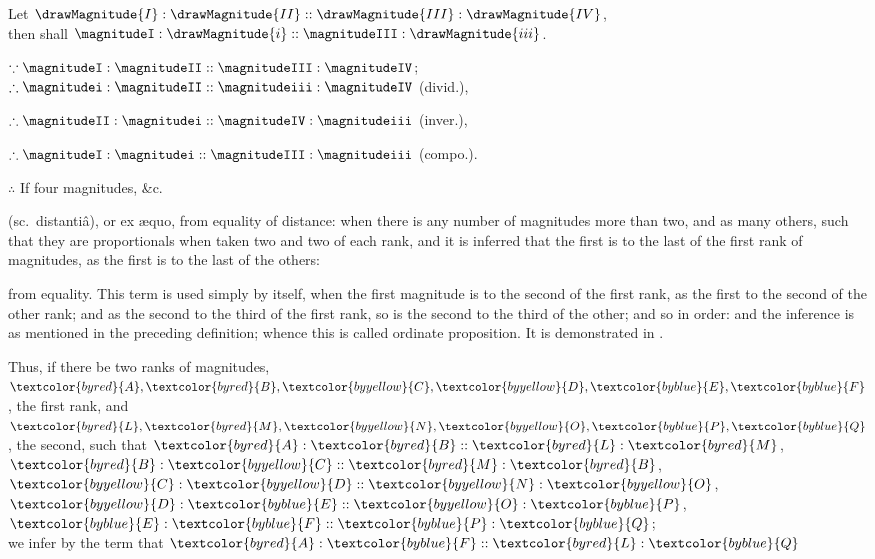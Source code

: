 \begin{center}
Let $\drawMagnitude{I} : \drawMagnitude{II} :: \drawMagnitude{III} : \drawMagnitude{IV}$,\\
then shall $\magnitudeI : \drawMagnitude{i} :: \magnitudeIII : \drawMagnitude{iii}$.

$\because \magnitudeI : \magnitudeII :: \magnitudeIII : \magnitudeIV$;\\ %
$\therefore \magnitudei : \magnitudeII :: \magnitudeiii : \magnitudeIV$ (divid.), %

$\therefore \magnitudeII : \magnitudei :: \magnitudeIV : \magnitudeiii$ (inver.),

$\therefore \magnitudeI : \magnitudei :: \magnitudeIII : \magnitudeiii$ (compo.).

$\therefore$ If four magnitudes, \&c.
\end{center}


\label{def:V.XVIII} 
 (sc.\ distantiâ), or ex \ae quo, from equality of distance: when there is any number of magnitudes more than two, and as many others, such that they are proportionals when taken two and two of each rank, and it is inferred that the first is to the last of the first rank of magnitudes, as the first is to the last of the others: 

\vfill\pagebreak

\label{def:V.XIX} 
\def\varA{\textcolor{byred}{A}}
\def\varB{\textcolor{byred}{B}}
\def\varC{\textcolor{byyellow}{C}}
\def\varD{\textcolor{byyellow}{D}}
\def\varE{\textcolor{byblue}{E}}
\def\varF{\textcolor{byblue}{F}}
\def\varL{\textcolor{byred}{L}}
\def\varM{\textcolor{byred}{M}}
\def\varN{\textcolor{byyellow}{N}}
\def\varO{\textcolor{byyellow}{O}}
\def\varP{\textcolor{byblue}{P}}
\def\varQ{\textcolor{byblue}{Q}}
 from equality. This term is used simply by itself, when the first magnitude is to the second of the first rank, as the first to the second of the other rank; and as the second to the third of the first rank, so is the second to the third of the other; and so in order: and the inference is as mentioned in the preceding definition; whence this is called ordinate proposition. It is demonstrated in .

\begin{center}
Thus, if there be two ranks of magnitudes,\\
$\varA, \varB, \varC, \varD, \varE, \varF$, the first rank,
and $\varL, \varM, \varN, \varO, \varP, \varQ$, the second,
such that $\varA : \varB :: \varL : \varM$, $\varB : \varC :: \varM : \varB$, $\varC : \varD :: \varN : \varO$, $\varD : \varE :: \varO : \varP$, $\varE : \varF :: \varP : \varQ$;\\
we infer by the term  that $\varA : \varF :: \varL : \varQ$
\end{center}

